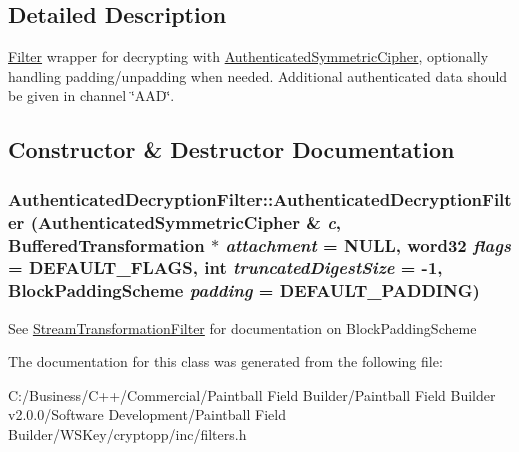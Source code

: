 \subsection{Detailed Description}
\hyperlink{class_filter}{Filter} wrapper for decrypting with \hyperlink{class_authenticated_symmetric_cipher}{AuthenticatedSymmetricCipher}, optionally handling padding/unpadding when needed. Additional authenticated data should be given in channel \char`\"{}AAD\char`\"{}. 

\subsection{Constructor \& Destructor Documentation}
\hypertarget{class_authenticated_decryption_filter_a8749a671716e49da0ac686df2d38df1e}{
\subsubsection[{AuthenticatedDecryptionFilter}]{\setlength{\rightskip}{0pt plus 5cm}AuthenticatedDecryptionFilter::AuthenticatedDecryptionFilter ({\bf AuthenticatedSymmetricCipher} \& {\em c}, \/  {\bf BufferedTransformation} $\ast$ {\em attachment} = {\ttfamily NULL}, \/  word32 {\em flags} = {\ttfamily DEFAULT\_\-FLAGS}, \/  int {\em truncatedDigestSize} = {\ttfamily -\/1}, \/  BlockPaddingScheme {\em padding} = {\ttfamily DEFAULT\_\-PADDING})}}
\label{class_authenticated_decryption_filter_a8749a671716e49da0ac686df2d38df1e}
See \hyperlink{class_stream_transformation_filter}{StreamTransformationFilter} for documentation on BlockPaddingScheme 

The documentation for this class was generated from the following file:\begin{DoxyCompactItemize}
\item 
C:/Business/C++/Commercial/Paintball Field Builder/Paintball Field Builder v2.0.0/Software Development/Paintball Field Builder/WSKey/cryptopp/inc/filters.h\end{DoxyCompactItemize}
